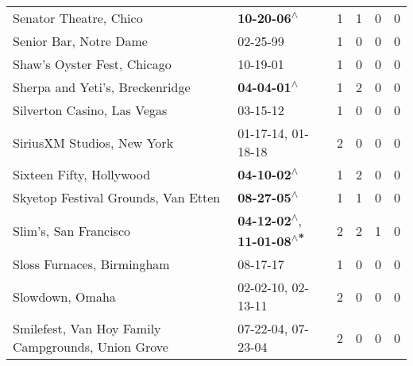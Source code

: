 \begin{supertabular}{p{0.4\textwidth}p{0.3\textwidth}p{0.05\textwidth}p{0.05\textwidth}p{0.05\textwidth}p{0.05\textwidth}}
                                                       Senator Theatre, Chico &                                                 \textbf{10-20-06\textsuperscript{$\wedge$}} &  1 &  1 &  0 &  0 \\
                                                       Senior Bar, Notre Dame &                                                                  02-25-99\textsuperscript{} &  1 &  0 &  0 &  0 \\
                                                  Shaw's Oyster Fest, Chicago &                                                                  10-19-01\textsuperscript{} &  1 &  0 &  0 &  0 \\
                                              Sherpa and Yeti's, Breckenridge &                                                 \textbf{04-04-01\textsuperscript{$\wedge$}} &  1 &  2 &  0 &  0 \\
                                                  Silverton Casino, Las Vegas &                                                                  03-15-12\textsuperscript{} &  1 &  0 &  0 &  0 \\
                                                   SiriusXM Studios, New York &                                      01-17-14\textsuperscript{}, 01-18-18\textsuperscript{} &  2 &  0 &  0 &  0 \\
                                                     Sixteen Fifty, Hollywood &                                                 \textbf{04-10-02\textsuperscript{$\wedge$}} &  1 &  2 &  0 &  0 \\
                                          Skyetop Festival Grounds, Van Etten &                                                 \textbf{08-27-05\textsuperscript{$\wedge$}} &  1 &  1 &  0 &  0 \\
                                                        Slim's, San Francisco &   \textbf{04-12-02\textsuperscript{$\wedge$}}, \textbf{11-01-08\textsuperscript{$\wedge$*}} &  2 &  2 &  1 &  0 \\
                                                   Sloss Furnaces, Birmingham &                                                                  08-17-17\textsuperscript{} &  1 &  0 &  0 &  0 \\
                                                              Slowdown, Omaha &                                      02-02-10\textsuperscript{}, 02-13-11\textsuperscript{} &  2 &  0 &  0 &  0 \\
                           Smilefest, Van Hoy Family Campgrounds, Union Grove &                                      07-22-04\textsuperscript{}, 07-23-04\textsuperscript{} &  2 &  0 &  0 &  0 \\

\end{supertabular}
